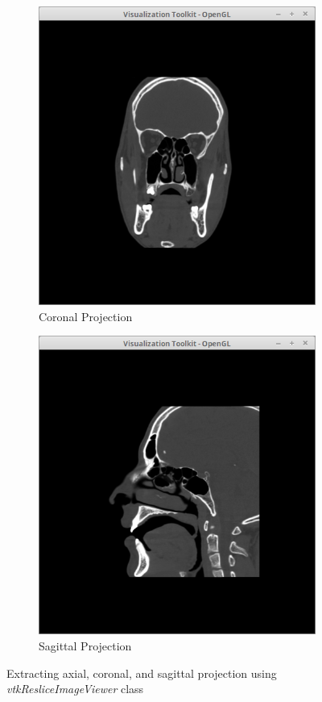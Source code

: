 \documentclass[10pt, b5paper]{article}
\begin{document}
\begin{figure}
\begin{subfigure}[b]{0.33\textwidth}
        \includegraphics[width=\textwidth]{cronal}
        \caption{Coronal Projection}
    \end{subfigure}
      \hfill
    \begin{subfigure}[b]{0.33\textwidth}
        \centering
        \includegraphics[width=\textwidth]{sagittal}
        \caption{Sagittal Projection}
    \end{subfigure}
    \caption{Extracting axial, coronal, and sagittal projection using \textit{vtkResliceImageViewer} class}
    \label{fig:projections}
\end{figure}
\end{document}
